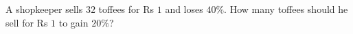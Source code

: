 A shopkeeper sells $32$ toffees for Rs $1$ and loses $40\%$. How many toffees should he sell for Rs $1$ to gain $20\%$?
